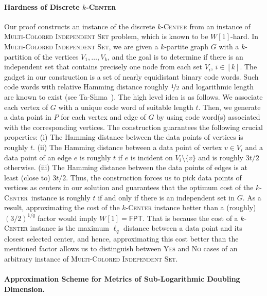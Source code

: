 \documentclass[11pt]{article}
\newcommand{\kc}{\textsc{$k$-Center}\xspace}
\newcommand{\fpt}{\textsf{FPT}\xspace}
\newcommand{\mcis}{\textsc{Multi-Colored Independent Set}\xspace}
\newcommand{\kcen}{\textsc{$k$-Center}}
\begin{document}
\paragraph*{Hardness of Discrete \kc}


Our proof constructs an instance of the discrete \kc  from an instance of \mcis problem, which is known to be $W[1]$-hard. In \mcis, we are given a $k$-partite graph $G$ with a $k$-partition of the vertices $V_1,\dots,V_k$, and  the goal is to determine if there is an independent set that contains precisely one node from each set $V_i$, $i\in[k]$.  
The gadget in our construction is a set of nearly equidistant binary code words. Such code words with relative Hamming distance roughly $\nicefrac{1}{2}$ and logarithmic length are known to exist (see Ta-Shma~\cite{ta-shma17:explicit-balanced-codes}). The high level idea is as follows. We associate each vertex of $G$ with a unique code word of suitable length $t$.
Then, we generate a data point in $P$ for each vertex and edge of $G$ by using code word(s) associated with the corresponding vertices. The construction guarantees the following crucial properties: (i) The Hamming distance between the data points of vertices is roughly $t$. (ii) The Hamming distance between 
a data point of vertex $v \in V_i$ and a data point of an edge $e$ is  roughly $t$ if $e$ is incident on $V_i \setminus \{v\}$ and is roughly $3t/2$ otherwise.
(iii) The Hamming distance between the data points of edges is at least (close to) $3t/2$. Thus, the construction forces us to pick data points of vertices as centers in our solution and guarantees that the optimum cost of the \kcen~instance is roughly $t$ if and only if there is an independent set in $G$. As a result, approximating the cost of the \kc instance better than a (roughly) $(3 / 2)^{1 / q}$ factor would imply $W[1] = \fpt$. That is because the cost of a \kc instance is the maximum $\ell_q$ distance between a data point and its closest selected center, and hence, approximating this cost better than the mentioned factor allows us to distinguish between \textsc{Yes} and \textsc{No} cases of an arbitrary instance of \mcis.

\paragraph*{Approximation Scheme for Metrics of Sub-Logarithmic Doubling Dimension.} 
\end{document}
